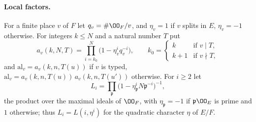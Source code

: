 \paragraph{Local factors.} For a finite place $v$ of $F$ let $q_v=\#\OO_F/v$, and $\eta_v=1$ if $v$ splits in $E$,
$\eta_v=-1$ otherwise. For integers $k\le N$ and a natural number $T$ put
\begin{equation}\label{pf:multnc:eq-aP}
a_v(k,N,T)=\prod_{i=k_0}^{N}\bigl(1-\eta_v^iq_v^{-i}\bigr),\qquad k_0=\begin{cases}k&\text{if }v\mid T,\\k+1&\text{if }
v\nmid T,\end{cases}
\end{equation}
and $\mathrm{al}_v=a_v(k,n,T(u))$ if $v$ is typed, $\mathrm{al}_v=a_v(k,n,T(u))\,a_v(k,n,T(u'))$ otherwise. For $i\ge2$ let
\begin{equation}\label{pf:multnc:eq-Lval}
L_i=\prod_{\mathfrak p}\bigl(1-\eta_{\mathfrak p}^iN\mathfrak p^{-i}\bigr)^{-1},
\end{equation}
the product over the maximal ideals of $\OO_F$, with $\eta_{\mathfrak p}=-1$ if $\mathfrak p\OO_E$ is prime and $1$
otherwise; thus $L_i=L(i,\eta^i)$ for the quadratic character $\eta$ of $E/F$.


